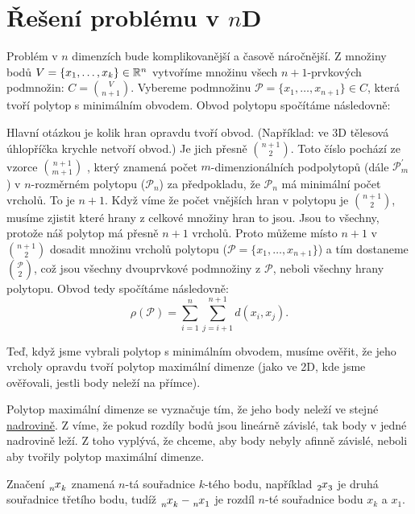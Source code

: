 \section{Řešení problému v \texorpdfstring{$n$D}{nD}}
\label{sec:reseni_1D}

Problém v $n$ dimenzích bude komplikovanější a časově náročnější. Z množiny bodů $V = \{x_1,\ldots, x_k\} \in \mathbb{R}^n$ vytvoříme množinu všech $n+1$-prvkových podmnožin: $C = \binom{V}{n+1}$. Vybereme podmnožinu $\mathcal{P} = \{x_1, \dots, x_{n+1}\} \in C$, která tvoří polytop s minimálním obvodem. Obvod polytopu spočítáme následovně:

Hlavní otázkou je kolik hran opravdu tvoří obvod. (Například: ve $3$D tělesová úhlopříčka krychle netvoří obvod.) Je jich přesně $\binom{n+1}{2}$. Toto číslo pochází ze vzorce $\binom{n+1}{m+1}$ \autocite[120]{coxeter1973regular},
který znamená počet $m$-dimenzionál\-ních podpolytopů (dále $\mathcal{P}^{\prime}_m$) v $n$-rozměrném polytopu ($\mathcal{P}_n$) za předpokladu, že $\mathcal{P}_n$ má minimální počet vrcholů. To je $n+1$. 
Když víme že počet vnějších hran v polytopu je $\binom{n+1}{2}$, musíme zjistit které hrany z celkové množiny hran to jsou. Jsou to všechny, protože náš polytop má přesně $n+1$ vrcholů. Proto můžeme místo $n+1$ v $\binom{n+1}{2}$ dosadit množinu vrcholů polytopu ($\mathcal{P} = \{x_1, \dots, x_{n+1}\}$) a tím dostaneme $\binom{\mathcal{P}}{2}$, což jsou všechny dvouprvkové podmnožiny z $\mathcal{P}$, neboli všechny hrany polytopu. Obvod tedy spočítáme následovně:
\begin{equation*}
  \rho(\mathcal{P}) = \sum_{i=1}^{n} \sum_{j=i+1}^{n+1}d(x_i, x_{j}).
\end{equation*}

Teď, když jsme vybrali polytop s minimálním obvodem, musíme ověřit, že jeho vrcholy opravdu tvoří polytop maximální dimenze (jako ve 2D, kde jsme ověřovali, jestli body neleží na přímce).

Polytop maximální dimenze se vyznačuje tím, že jeho body neleží ve stejné \hyperref[definice:nadrovina]{nadrovině}. Z  víme, že pokud rozdíly bodů jsou lineárně závislé, tak body v jedné nadrovině leží. Z toho vyplývá, že chceme, aby body nebyly afinně závislé, neboli aby tvořily polytop maximální dimenze.  

\begin{poznamka} 
  \label{poznamka:varovani_index}
  Značení $\x{n}{k}$ znamená $n$-tá souřadnice $k$-tého bodu, například $\x{2}{3}$ je dru\-há souřadnice třetího bodu, tudíž $\x{n}{k} - \x{n}{1}$ je rozdíl $n$-té souřadnice bodu $x_k$ a $x_1$. 
\end{poznamka}

